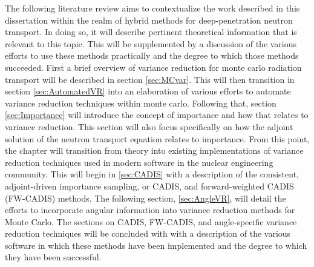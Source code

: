 The following literature review aims to contextualize the work described in this
dissertation within the realm of hybrid methods for deep-penetration
neutron transport. In doing
so, it will describe pertinent theoretical information that is relevant to this
topic. This will be supplemented by a discussion of the various efforts
to use these methods practically and the degree to which those methods succeeded.
First a brief overview of variance reduction for monte carlo radiation transport
will be described in section \ref{sec:MCvar}.
This will then transition in section \ref{sec:AutomatedVR} into an elaboration
of various efforts to automate variance reduction techniques within monte carlo.
Following that, section \ref{sec:Importance} will introduce the concept of
importance and how that relates to variance reduction. This section will also
focus specifically on how the adjoint solution of the neutron transport equation
relates to importance.
From this point, the chapter will transition
from theory into existing implementations
of variance reduction techniques used in modern software in the nuclear
engineering community. This will begin in \ref{sec:CADIS} with a description of
the consistent, adjoint-driven importance sampling, or CADIS, and
forward-weighted CADIS (FW-CADIS) methods.
The following section, \ref{sec:AngleVR}, will detail the efforts to incorporate
angular information into variance reduction methods for Monte Carlo.
The sections on CADIS, FW-CADIS, and angle-specific variance reduction
techniques will be concluded with with a description of the
various software in which these methods have been implemented and the degree to
which they have been successful.
